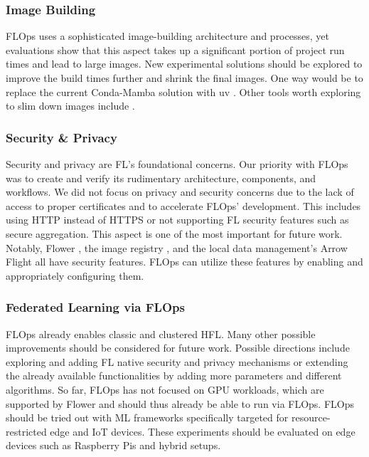 \subsubsection{Image Building}
FLOps uses a sophisticated image-building architecture and processes, yet evaluations show that this aspect takes up a significant portion of project run times and lead to large images.
New experimental solutions should be explored to improve the build times further and shrink the final images.
One way would be to replace the current Conda-Mamba solution with uv \cite{uv}.
Other tools worth exploring to slim down images include \cite{slim,dragonfly,nydus}.

\subsubsection{Security \& Privacy}
Security and privacy are FL's foundational concerns.
Our priority with FLOps was to create and verify its rudimentary architecture, components, and workflows.
We did not focus on privacy and security concerns due to the lack of access to proper certificates and to accelerate FLOps' development.
This includes using HTTP instead of HTTPS or not supporting FL security features such as secure aggregation.
This aspect is one of the most important for future work.
Notably, Flower \cite{flower_tls}, the image registry \cite{docs:cncf_distribution_registry}, and the local data management's Arrow Flight \cite{docs:arrow_flight} all have security features.
FLOps can utilize these features by enabling and appropriately configuring them.

\subsubsection{Federated Learning via FLOps}
FLOps already enables classic and clustered HFL.
Many other possible improvements should be considered for future work.
Possible directions include exploring and adding FL native security and privacy mechanisms or extending the already available functionalities by adding more parameters and different algorithms.
So far, FLOps has not focused on GPU workloads, which are supported by Flower and should thus already be able to run via FLOps.
FLOps should be tried out with ML frameworks specifically targeted for resource-restricted edge and IoT devices.
These experiments should be evaluated on edge devices such as Raspberry Pis and hybrid setups.

